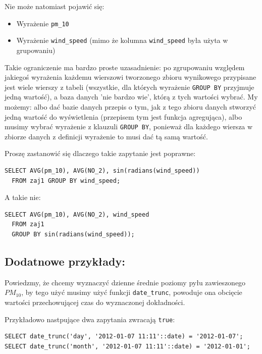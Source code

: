 \documentclass[a4paper]{article}
\begin{document}
Nie może natomiast pojawić się:
%
\begin{itemize}

\item Wyrażenie \texttt{pm\_10}

\item Wyrażenie \texttt{wind\_speed} (mimo że kolumna \texttt{wind\_speed} była użyta w
grupowaniu)

\end{itemize}

Takie ograniczenie ma bardzo proste uzasadnienie: po zgrupowaniu względem
jakiegoś wyrażenia każdemu wierszowi tworzonego zbioru wynikowego
przypisane jest wiele wierszy z tabeli (wszystkie, dla których wyrażenie \texttt{GROUP BY}
przyjmuje jedną wartość), a baza danych 'nie bardzo wie', którą z tych wartości
wybrać. My możemy: albo dać bazie danych przepis o tym, jak z tego zbioru danych
stworzyć jedną wartość do wyświetlenia (przepisem tym jest funkcja agregująca),
albo musimy wybrać wyrażenie z klauzuli \texttt{GROUP BY}, ponieważ dla każdego
wiersza w zbiorze danych z definicji wyrażenie to musi dać tą samą wartość.

Proszę zastanowić się dlaczego takie zapytanie jest poprawne:

\begin{verbatim}
SELECT AVG(pm_10), AVG(NO_2), sin(radians(wind_speed))
  FROM zaj1 GROUP BY wind_speed;
\end{verbatim}


A takie nie:

\begin{verbatim}
SELECT AVG(pm_10), AVG(NO_2), wind_speed
  FROM zaj1
  GROUP BY sin(radians(wind_speed));
\end{verbatim}


\subsection{Dodatnowe przykłady:%
  \label{dodatnowe-przyklady}%
}

Powiedzmy, że chcemy wyznaczyć dzienne średnie poziomy pyłu zawieszonego
$PM_{10}$, by tego użyć musimy użyć funkcji \texttt{date\_trunc}, powoduje ona
obcięcie wartości przechowującej czas do wyznaczonej dokładności.

Przykładowo nastpujące dwa zapytania zwracają \texttt{true}:

\begin{verbatim}
SELECT date_trunc('day', '2012-01-07 11:11'::date) = '2012-01-07';
SELECT date_trunc('month', '2012-01-07 11:11'::date) = '2012-01-01';
\end{verbatim}
\end{document}
